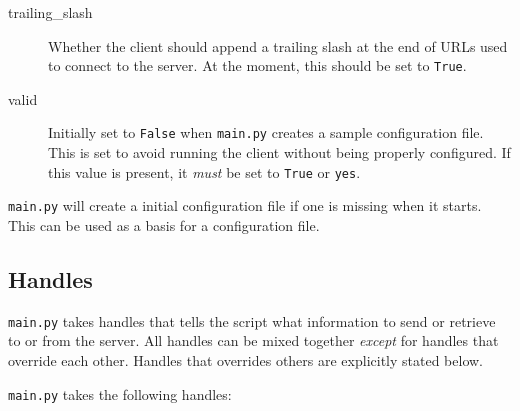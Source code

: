 \begin{description}
    \item[trailing\_slash]  Whether the client should append a trailing slash
        at the end of URLs used to connect to the server. At the moment, this
        should be set to \texttt{True}.
    \item[valid]    Initially set to \texttt{False} when \texttt{main.py}
        creates a sample configuration file. This is set to avoid running the
        client without being properly configured. If this value is present, it
        \textit{must} be set to \texttt{True} or \texttt{yes}.
\end{description}

\texttt{main.py} will create a initial configuration file if one is missing
when it starts. This can be used as a basis for a configuration file. 

\subsection{Handles}
\label{sec:handles}
\texttt{main.py} takes handles that tells the script what information to send
or retrieve to or from the server. All handles can be mixed together
\textit{except} for handles that override each other. Handles that overrides
others are explicitly stated below.

\texttt{main.py} takes the following handles:

